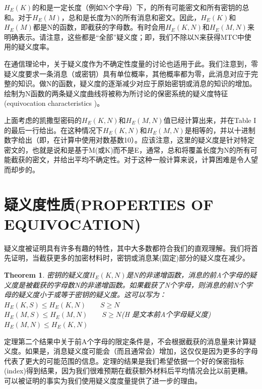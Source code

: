 \documentclass[]{article}
\newtheorem{theorem}{Theorem}
\begin{document}
$H_E(K)$的和是一定长度（例如N个字母）下，的所有可能密文和所有密钥的总和。对于$H_E(M)$，总和是长度为N的所有消息和密文。因此，$H_E(K)$和$H_E(M)$都是N的函数，即截获的字母数。有时会用$H_E(K,N)$和$H_E(M,N)$来明确表示。请注意，这些都是“全部”疑义度；即，我们不除以N来获得MTC中使用的疑义度率。

在通信理论中，关于疑义度作为不确定性度量的讨论也适用于此。我们注意到，零疑义度要求一条消息（或密钥）具有单位概率，其他概率都为零，此消息对应于完整的知识。做N的函数，疑义度的逐渐减少对应于原始密钥或消息的知识的增加。绘制为N函数的两条疑义度曲线将被称为所讨论的保密系统的疑义度特征(equivocation characteristics )。


上面考虑的凯撒型密码的$H_E(K,N)$和$H_E(M,N)$值已经计算出来，并在Table I的最后一行给出。在这种情况下$H_E(K,N)$和$H_E(M,N)$是相等的，并以十进制数字给出（即，在计算中使用对数基数10）。应该注意，这里的疑义度是针对特定密文的，也就是说和是基于M(或K)而不是E，通常，总和将覆盖长度为N的所有可能截获的密文，并给出平均不确定性。对于这种一般计算来说，计算困难是令人望而却步的。

\newpage
%   
%

\section{疑义度性质(PROPERTIES OF EQUIVOCATION)}

疑义度被证明具有许多有趣的特性，其中大多数都符合我们的直观理解。我们将首先证明，当截获更多的加密材料时，密钥或消息某(固定)部分的疑义度在减少。

\begin{theorem}
	密钥的疑义度$H_E(K,N)$是N的非递增函数，消息的前A个字母的疑义度是被截获的字母数N的非递增函数。如果截获了N个字母，则消息的前N个字母的疑义度小于或等于密钥的疑义度。这可以写为：\\
	$H_E(K,S) \leq H_E(K,N) \qquad S\geq N$\\
	$H_E(M,S) \leq H_E(M,N) \qquad S\geq N$(H 是文本前A个字母疑义度)\\
	$H_E(M,N) \leq H_E(K,N)$
\end{theorem}

定理第二个结果中关于前A个字母的限定条件是，不会根据截获的消息量来计算疑义度。如果是，消息疑义度可能会（而且通常会）增加，这仅仅是因为更多的字母代表了更大的可能范围的信息。定理的结果是我们希望依据一个好的保密指标(index)得到结果，因为我们很难预期在截获额外材料后平均情况会比以前更糟。可以被证明的事实为我们使用疑义度度量提供了进一步的理由。
\end{document}
